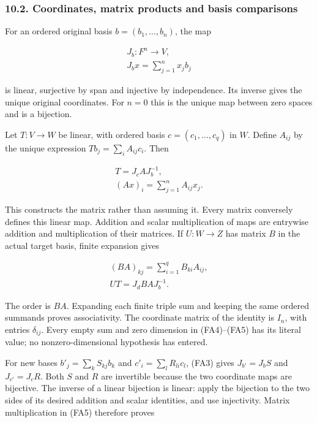 \documentclass[
  11pt,
]{article}
\begin{document}
\subsubsection{10.2. Coordinates, matrix products and basis
comparisons}\label{coordinates-matrix-products-and-basis-comparisons}

For an ordered original basis \(b=(b_1,\ldots,b_n)\), the map

\[
\begin{gathered}
J_b:F^n\longrightarrow V, \\ J_b x=\sum_{j=1}^n x_j b_j
\end{gathered}
\tag{FA3}
\]

is linear, surjective by span and injective by independence. Its inverse
gives the unique original coordinates. For \(n=0\) this is the unique
map between zero spaces and is a bijection.

Let \(T:V\to W\) be linear, with ordered basis \(c=(c_1,\ldots,c_q)\) in
\(W\). Define \(A_{ij}\) by the unique expression
\(Tb_j=\sum_i A_{ij}c_i\). Then

\[
\begin{gathered}
T=J_c A J_b^{-1}, \\ (Ax)_i=\sum_{j=1}^n A_{ij}x_j.
\end{gathered}
\tag{FA4}
\]

This constructs the matrix rather than assuming it. Every matrix
conversely defines this linear map. Addition and scalar multiplication
of maps are entrywise addition and multiplication of their matrices. If
\(U:W\to Z\) has matrix \(B\) in the actual target basis, finite
expansion gives

\[
\begin{gathered}
(BA)_{kj}=\sum_{i=1}^q B_{ki}A_{ij}, \\ UT=J_d BA J_b^{-1}.
\end{gathered}
\tag{FA5}
\]

The order is \(BA\). Expanding each finite triple sum and keeping the
same ordered summands proves associativity. The coordinate matrix of the
identity is \(I_n\), with entries \(\delta_{ij}\). Every empty sum and
zero dimension in (FA4)--(FA5) has its literal value; no
nonzero-dimensional hypothesis has entered.

For new bases \(b'_j=\sum_k S_{kj}b_k\) and \(c'_i=\sum_l R_{li}c_l\),
(FA3) gives \(J_{b'}=J_b S\) and \(J_{c'}=J_c R\). Both \(S\) and \(R\)
are invertible because the two coordinate maps are bijective. The
inverse of a linear bijection is linear: apply the bijection to the two
sides of its desired addition and scalar identities, and use
injectivity. Matrix multiplication in (FA5) therefore proves
\end{document}
